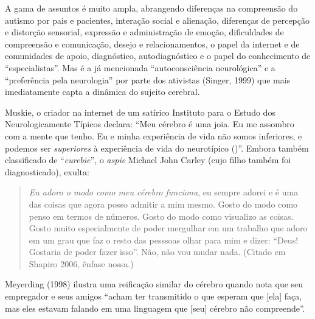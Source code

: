 A gama de assuntos é muito ampla, abrangendo diferenças na compreensão
do autismo por pais e pacientes, interação social e alienação,
diferenças de percepção e distorção sensorial, expressão e administração
de emoção, dificuldades de compreensão e comunicação, desejo e
relacionamentos, o papel da internet e de comunidades de apoio,
diagnóstico, autodiagnóstico e o papel do conhecimento de
``especialistas''. Mas é a já mencionada ``autoconsciência neurológica''
e a ``preferência pela neurologia'' por parte dos ativistas (Singer,
1999) que mais imediatamente capta a dinâmica do sujeito cerebral.

Muskie, o criador na internet de um satírico Instituto para o Estudo dos
Neurologicamente Típicos declara: ``Meu cérebro é uma joia. Eu me
assombro com a mente que tenho. Eu e minha experiência de vida não somos
inferiores, e podemos ser \emph{superiores} à experiência de vida do
neurotípico ()''. Embora também classificado de ``\emph{curebie}'', o
\emph{aspie} Michael John Carley (cujo filho também foi diagnosticado),
exulta:

\begin{quote}
\emph{Eu adoro o modo como meu cérebro funciona}, eu sempre adorei e é
uma das coisas que agora posso admitir a mim mesmo. Gosto do modo como
penso em termos de números. Gosto do modo como visualizo as coisas.
Gosto muito especialmente de poder mergulhar em um trabalho que adoro em
um grau que faz o resto das pesssoas olhar para mim e dizer: ``Deus!
Gostaria de poder fazer isso''. Não, não vou mudar nada. (Citado em
Shapiro 2006, ênfase nossa.)
\end{quote}

Meyerding (1998) ilustra uma reificação similar do cérebro quando nota
que seu empregador e seus amigos ``acham ter transmitido o que esperam
que {[}ela{]} faça, mas eles estavam falando em uma linguagem que
{[}seu{]} cérebro não compreende''.

